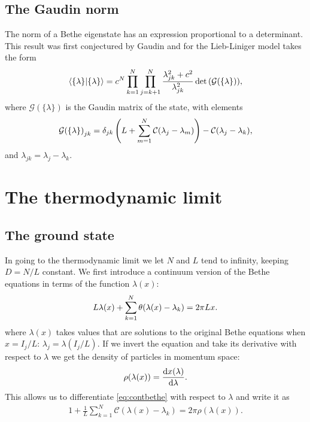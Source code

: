 \documentclass[11pt, a4paper]{report} %
\begin{document}
\subsection{The Gaudin norm}
The norm of a Bethe eigenstate has an expression proportional to a determinant.
This result was first conjectured by Gaudin and for the Lieb-Liniger model takes the form~\cite{Caux2007}
\begin{align}
  \braket{\{\lambda\}}{\{\lambda\}} = c^N \prod_{k=1}^N \prod_{j=k+1}^N \frac{\lambda_{jk}^2 + c^2}{\lambda_{jk}^2} \det\qty(\mathcal{G}\qty(\{\lambda\})),
\end{align}
where $\mathcal{G}(\{\lambda\})$ is the Gaudin matrix of the state, with elements
\begin{align}\label{eq:gaudin}
  \mathcal{G}{(\{\lambda\})}_{jk} = \delta_{jk} \left(L + \sum_{m=1}^{N}\mathcal{C}\qty(\lambda_j-\lambda_m)\right) - \mathcal{C}\qty(\lambda_j- \lambda_k),
\end{align}
and \(\lambda_{jk} = \lambda_j-\lambda_k\).


\section{The thermodynamic limit}
\subsection{The ground state}
In going to the thermodynamic limit we let \(N\) and \(L\) tend to infinity, keeping \(D=N/L\) constant.
We first introduce a continuum version of the Bethe equations in terms of the function \(\lambda(x)\):
\begin{align}
  \label{eq:contbethe}
  L \lambda(x) + \sum_{k=1}^N\theta\qty(\lambda(x)-\lambda_k) = 2 \pi L x.
\end{align}
where \(\lambda(x)\) takes values that are solutions to the original Bethe equations when \(x=I_j/L\): \(\lambda_j=\lambda(I_j/L)\).
If we invert the equation and take its derivative with respect to \(\lambda\) we get the density of particles in momentum space:
\begin{align}
  \rho(\lambda(x)) = \frac{\dd x\qty(\lambda)}{\dd \lambda}.
\end{align}
This allows us to differentiate \cref{eq:contbethe} with respect to \(\lambda\) and write it as 
\begin{align}
  1+\frac{1}{L} \sum_{k=1}^{N} \mathcal{C}(\lambda(x)- \lambda_k) = 2\pi \rho(\lambda(x)).
\end{align}
\end{document}
